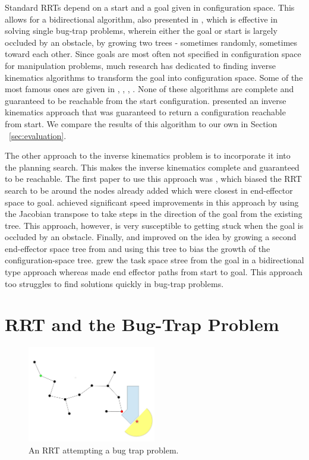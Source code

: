 \documentclass[conference]{IEEEtran}
\begin{document}
Standard RRTs depend on a start and a goal given in configuration space. This allows for a bidirectional algorithm, also presented in
\cite{lavalle00}, which is effective in solving single bug-trap problems, wherein either the goal or start is largely occluded by an
obstacle, by growing two trees - sometimes randomly, sometimes toward each other. Since goals are most often not specified in configuration
space for manipulation problems, much research has dedicated to finding inverse kinematics algorithms to transform the goal into
configuration space. Some of the most famous ones are given in \cite{goldenberg85}, \cite{guez88}, \cite{chang87}, \cite{parker89}. None of
these algorithms are complete and guaranteed to be reachable from the start configuration. \cite{ahuactzin99} presented an inverse
kinematics approach that was guaranteed to return a configuration reachable from start. We compare the results of this algorithm to our own
in Section ~\ref{sec:evaluation}. 

The other approach to the inverse kinematics problem is to incorporate it into the planning search. This makes the inverse kinematics
complete and guaranteed to be reachable. The first paper to use this approach was \cite{bertram06}, which biased the RRT search to be around
the nodes already added which were closest in end-effector space to goal. \cite{vande07} achieved significant speed improvements in this
approach by using the Jacobian transpose to take steps in the direction of the goal from the existing tree. This approach, however, is very
susceptible to getting stuck when the goal is occluded by an obstacle. Finally, \cite{diankov08} and \cite{yao05}  improved on the idea by
growing a second end-effector space tree from and using this tree to bias the growth of the configuration-space tree. \cite{diankov08} grew
the task space stree from the goal in a bidirectional type approach whereas \cite{yao05} made end effector paths from start to goal. This
approach too struggles to find solutions quickly in bug-trap problems.
 
\section{RRT and the Bug-Trap Problem}

\begin{figure}[h!]
  \centering
    \includegraphics[width=0.5\textwidth]{figures/bugTrapRRT.jpg}
  \caption{An RRT attempting a bug trap problem. \label{fig:BugTrapRRT} }
\end{figure}
\end{document}
